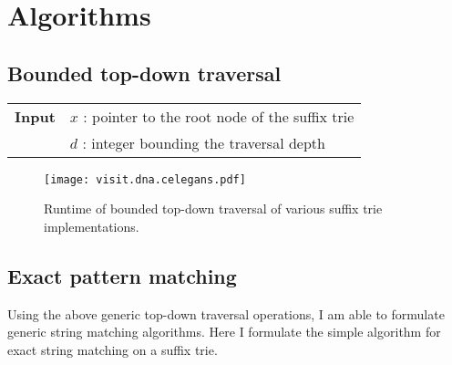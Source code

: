 \section{Algorithms}

\subsection{Bounded top-down traversal}

\begin{center}
\begin{minipage}[t]{.7\textwidth}
\begin{algorithm}[H]
\begin{tabular}{ll}
\textbf{Input}  & $x$ : pointer to the root node of the suffix trie\\
 			    & $d$ : integer bounding the traversal depth\\
\end{tabular}
\begin{algorithmic}[1]
		\Repeat
			\State {}
		\Until {}
	\EndIf
\EndIf
\end{algorithmic}
\label{alg:st-dfs}
\end{algorithm}
\end{minipage}
\end{center}

\begin{figure}[h]
\begin{center}
\caption[Top-down traversal runtime]{Runtime of bounded top-down traversal of various suffix trie implementations.}
\label{fig:visit-dna}
\texttt{[image: visit.dna.celegans.pdf]}
\end{center}
\end{figure}

\subsection{Exact pattern matching}

Using the above generic top-down traversal operations, I am able to formulate generic string matching algorithms.
Here I formulate the simple algorithm for exact string matching on a suffix trie.

